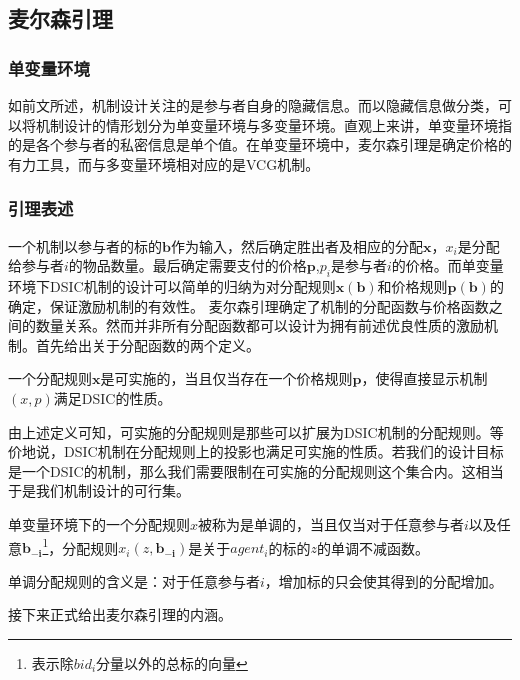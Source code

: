 \documentclass[promaster]{thesis-uestc}
\begin{document}
\subsection{麦尔森引理}

\subsubsection{单变量环境}

如前文所述，机制设计关注的是参与者自身的隐藏信息。而以隐藏信息做分类，可以将机制设计的情形划分为单变量环境与多变量环境。直观上来讲，单变量环境指的是各个参与者的私密信息是单个值。在单变量环境中，麦尔森引理是确定价格的有力工具，而与多变量环境相对应的是VCG机制。

\subsubsection{引理表述}

一个机制以参与者的标的$\mathbf{b}$作为输入，然后确定胜出者及相应的分配$\mathbf{x}$，$x_i$是分配给参与者$i$的物品数量。最后确定需要支付的价格$\mathbf{p}$,$p_i$是参与者$i$的价格。而单变量环境下DSIC机制的设计可以简单的归纳为对分配规则$\mathbf{x(b)}$和价格规则$\mathbf{p(b)}$的确定，保证激励机制的有效性。
麦尔森引理确定了机制的分配函数与价格函数之间的数量关系。然而并非所有分配函数都可以设计为拥有前述优良性质的激励机制。首先给出关于分配函数的两个定义。

\begin{definition}[可实施的分配规则]
一个分配规则$\mathbf{x}$是可实施的，当且仅当存在一个价格规则$\mathbf{p}$，使得直接显示机制$(x,p)$满足DSIC的性质。
\end{definition}

由上述定义可知，可实施的分配规则是那些可以扩展为DSIC机制的分配规则。等价地说，DSIC机制在分配规则上的投影也满足可实施的性质。若我们的设计目标是一个DSIC的机制，那么我们需要限制在可实施的分配规则这个集合内。这相当于是我们机制设计的可行集。

\begin{definition}[单调分配规则]
    单变量环境下的一个分配规则$x$被称为是单调的，当且仅当对于任意参与者$i$以及任意$\mathbf{b_{-i}}$\footnote{表示除$bid_i$分量以外的总标的向量}，分配规则$x_i(z,\mathbf{b_{-i}})$是关于$agent_i$的标的$z$的单调不减函数。
\end{definition}

单调分配规则的含义是：对于任意参与者$i$，增加标的只会使其得到的分配增加。

接下来正式给出麦尔森引理的内涵。
\end{document}
